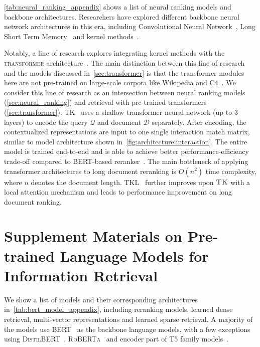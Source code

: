 \noindent\cref{tab:neural_ranking_appendix} shows a list of neural ranking models and backbone architectures. Researchers have explored different backbone neural network architectures in this era, including Convolutional Neural Network~\cite[CNN,][]{lecun1989backpropagation,lecun1998gradient}, Long Short Term Memory~\cite[LSTM,][]{hochreiter1997long} and kernel methods~\cite{vert2004primer,chang2010training,xiong2017knrm}. 

Notably, a line of research explores integrating kernel methods with the \textsc{transformer} architecture~\cite{vaswani2017attention}. 
The main distinction between this line of research and the models discussed in~\cref{sec:transformer} is that the transformer modules here are not pre-trained on large-scale corpora like Wikipedia and C4~\cite{devlin-etal-2019-bert,raffel2020transfer}. We consider this line of research as an intersection between neural ranking models (\cref{sec:neural_ranking}) and retrieval with pre-trained transformers (\cref{sec:transformer}).
\textsc{TK}~\cite{hofstatter2020interpretable} uses a shallow transformer neural network (up to 3 layers) to encode the query $\mathcal{Q}$ and document $\mathcal{D}$ separately. After encoding, the contextualized representations are input to one single interaction match matrix, similar to model architecture shown in~\cref{fig:architecture:interaction}. The entire model is trained end-to-end and is able to achieve better performance-efficiency trade-off compared to \textsc{BERT}-based reranker~\cite{nogueira2019multi}.
The main bottleneck of applying transformer architectures to long document reranking is $O(n^2)$ time complexity, where $n$ denotes the document length. \textsc{TKL}~\cite{hofstatter2020local} further improves upon $\textsc{TK}$ with a local attention mechanism and leads to performance improvement on long document ranking.



\section{Supplement Materials on  Pre-trained Language Models for Information Retrieval}
\label{appendix:pretrained_transformer}

We show a list of models and their corresponding architectures in~\cref{tab:bert_model_appendix}, including reranking models, learned dense retrieval, multi-vector representations and learned sparse retrieval. A majority of the models use \textsc{BERT}~\cite{devlin-etal-2019-bert} as the backbone language models, with a few exceptions using \textsc{DistilBERT}~\cite{sanh2019distilbert}, \textsc{RoBERTa}~\cite{liu2019roberta} and encoder part of \textsc{T5} family models~\cite{raffel2020transfer,sanh2022multitask,mo2023convgqr,chung2024scaling}.

